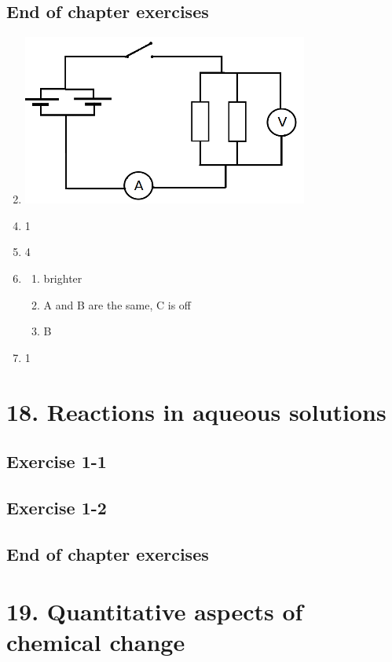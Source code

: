 \subsection{End of chapter exercises}
\begin{enumerate}[noitemsep, label=\textbf{(\arabic*)} ]
\setcounter{enumi}{1}
 \item \includegraphics[width=.3\textwidth]{photos/electric_circuits_circuitdiagrm.png}
\end{enumerate}
\begin{multicols}{3}
 \begin{enumerate}[noitemsep, label=\textbf{(\arabic*)} ]
\setcounter{enumi}{3}
\item 1
\item 4
\item 
 \begin{enumerate}[noitemsep, label=\textbf{(\alph*)} ]
\item brighter
\item A and B are the same, C is off
\item B
\end{enumerate}
\item 1
 \end{enumerate}
\end{multicols}

\section{18. Reactions in aqueous solutions}
\subsection{Exercise 1-1}
\subsection{Exercise 1-2}
\subsection{End of chapter exercises}
\section{19. Quantitative aspects of chemical change}
